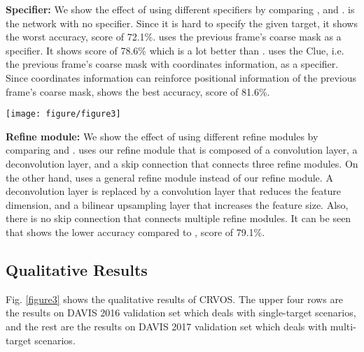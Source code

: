 \documentclass{article}
\begin{document}
\vspace{1mm}
\noindent\textbf{Specifier:} We show the effect of using different specifiers by comparing ,  and .  is the network with no specifier. Since it is hard to specify the given target, it shows the worst accuracy,  score of 72.1\%.  uses the previous frame's coarse mask as a specifier. It shows  score of 78.6\% which is a lot better than .  uses the Clue, i.e. the previous frame's coarse mask with coordinates information, as a specifier. Since coordinates information can reinforce positional information of the previous frame's coarse mask,  shows the best accuracy,  score of 81.6\%.



\begin{figure*}[h]
	\centering
	\texttt{[image: figure/figure3]}
	\caption{Qualitative results of CRVOS on DAVIS 2016 validation set and DAVIS 2017 validation set. The numbers below the figure indicate the ratio of the past frames to the total frames. 0\% indicates the initial frame and 100\% indicates the last frame. As seen in the figure, CRVOS consistently produces high quality segmentations in relatively simple scenarios.}
	\label{figure3}
\end{figure*}


\vspace{1mm}
\noindent\textbf{Refine module:} We show the effect of using different refine modules by comparing  and .  uses our refine module that is composed of a convolution layer, a deconvolution layer, and a skip connection that connects three refine modules. On the other hand,  uses a general refine module instead of our refine module. A deconvolution layer is replaced by a convolution layer that reduces the feature dimension, and a bilinear upsampling layer that increases the feature size. Also, there is no skip connection that connects multiple refine modules. It can be seen that  shows the lower accuracy compared to ,  score of 79.1\%.


\subsection{Qualitative Results} \label{qualitative results}
Fig. \ref{figure3} shows the qualitative results of CRVOS. The upper four rows are the results on DAVIS 2016 \cite{perazzi2016benchmark} validation set which deals with single-target scenarios, and the rest are the results on DAVIS 2017 \cite{pont20172017} validation set which deals with multi-target scenarios.
\end{document}
